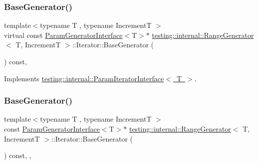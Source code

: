 \subsubsection{\texorpdfstring{BaseGenerator()}{BaseGenerator()}\hspace{0.1cm}{\footnotesize\ttfamily [1/3]}}
{\footnotesize\ttfamily template$<$typename T , typename IncrementT $>$ \\
virtual const \mbox{\hyperlink{classtesting_1_1internal_1_1_param_generator_interface}{Param\+Generator\+Interface}}$<$T$>$$\ast$ \mbox{\hyperlink{classtesting_1_1internal_1_1_range_generator}{testing\+::internal\+::\+Range\+Generator}}$<$ T, IncrementT $>$\+::Iterator\+::\+Base\+Generator (\begin{DoxyParamCaption}{ }\end{DoxyParamCaption}) const\hspace{0.3cm}{\ttfamily [inline]}, {\ttfamily [virtual]}}



Implements \mbox{\hyperlink{classtesting_1_1internal_1_1_param_iterator_interface_a17500953df75ecda1ace46c08ff731e9}{testing\+::internal\+::\+Param\+Iterator\+Interface$<$ T $>$}}.

\mbox{\label{classtesting_1_1internal_1_1_range_generator_1_1_iterator_aa1dc4151e1eed1c546059ecb4f72440b}} 
\subsubsection{\texorpdfstring{BaseGenerator()}{BaseGenerator()}\hspace{0.1cm}{\footnotesize\ttfamily [2/3]}}
{\footnotesize\ttfamily template$<$typename T , typename IncrementT $>$ \\
const \mbox{\hyperlink{classtesting_1_1internal_1_1_param_generator_interface}{Param\+Generator\+Interface}}$<$T$>$$\ast$ \mbox{\hyperlink{classtesting_1_1internal_1_1_range_generator}{testing\+::internal\+::\+Range\+Generator}}$<$ T, IncrementT $>$\+::Iterator\+::\+Base\+Generator (\begin{DoxyParamCaption}{ }\end{DoxyParamCaption}) const\hspace{0.3cm}{\ttfamily [inline]}, {\ttfamily [override]}, {\ttfamily [virtual]}}



